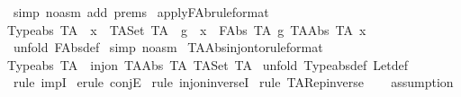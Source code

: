 \begin{isabellebody}
\isamarkupfalse%
\ {\isacharparenleft}simp\ {\isacharparenleft}no{\isacharunderscore}asm{\isacharparenright}\ add{\isacharcolon}\ prems{\isacharparenright}\isanewline
{}\isamarkupfalse%
%
\endisatagproof
{\isafoldproof}%
%
\isadelimproof
\isanewline
%
\endisadelimproof
\isanewline
{}\isamarkupfalse%
\ apply{\isacharunderscore}FAb{\isacharbrackleft}rule{\isacharunderscore}format{\isacharbrackright}\ {\isacharcolon}\ \isanewline
{\isachardoublequoteopen}Typeabs\ TA\ {\isacharminus}{\isacharminus}{\isachargreater}\ x\ {\isacharcolon}\ TASet\ TA\ {\isacharminus}{\isacharminus}{\isachargreater}\ {\isacharparenleft}g\ {\isacharpercent}{\isacharcircum}\ x{\isacharparenright}\ {\isacharequal}\ {\isacharparenleft}FAbs\ TA\ g{\isacharparenright}\ {\isacharparenleft}TAAbs\ TA\ x{\isacharparenright}{\isachardoublequoteclose}\isanewline
%
\isadelimproof
%
\endisadelimproof
%
\isatagproof
{}\isamarkupfalse%
\ {\isacharparenleft}unfold\ FAbs{\isacharunderscore}def{\isacharparenright}\isanewline
{}\isamarkupfalse%
\ {\isacharparenleft}simp\ {\isacharparenleft}no{\isacharunderscore}asm{\isacharparenright}{\isacharparenright}\isanewline
{}\isamarkupfalse%
%
\endisatagproof
{\isafoldproof}%
%
\isadelimproof
\isanewline
%
\endisadelimproof
\isanewline
{}\isamarkupfalse%
\ TAAbs{\isacharunderscore}inj{\isacharunderscore}onto{\isacharbrackleft}rule{\isacharunderscore}format{\isacharbrackright}{\isacharcolon}\ \isanewline
{\isachardoublequoteopen}Typeabs\ TA\ {\isacharminus}{\isacharminus}{\isachargreater}\ inj{\isacharunderscore}on\ {\isacharparenleft}TAAbs\ TA{\isacharparenright}\ {\isacharparenleft}TASet\ TA{\isacharparenright}{\isachardoublequoteclose}\isanewline
%
\isadelimproof
%
\endisadelimproof
%
\isatagproof
{}\isamarkupfalse%
\ {\isacharparenleft}unfold\ Typeabs{\isacharunderscore}def\ Let{\isacharunderscore}def{\isacharparenright}\isanewline
{}\isamarkupfalse%
\ {\isacharparenleft}rule\ impI{\isacharparenright}{\isacharplus}\isanewline
{}\isamarkupfalse%
\ {\isacharparenleft}erule\ conjE{\isacharparenright}{\isacharplus}\isanewline
{}\isamarkupfalse%
\ {\isacharparenleft}rule\ inj{\isacharunderscore}on{\isacharunderscore}inverseI{\isacharparenright}\isanewline
{}\isamarkupfalse%
\ {\isacharparenleft}rule\ TARep{\isacharunderscore}inverse{\isacharparenright}\isanewline
{}\isamarkupfalse%
\ {}\ \isanewline
{}\isamarkupfalse%
\ {\isacharparenleft}assumption{\isacharparenright}\isanewline

\end{isabellebody}
